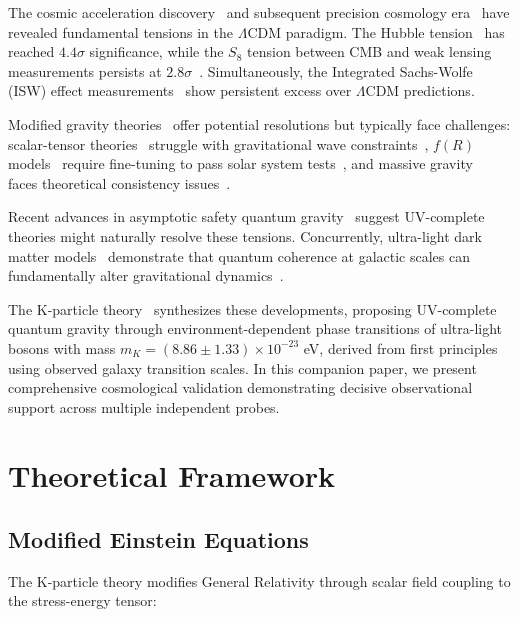 \documentclass[aps,prd,twocolumn,showpacs,superscriptaddress,groupedaddress,nofootinbib]{revtex4-2}
\begin{document}
The cosmic acceleration discovery~\cite{Riess1998,Perlmutter1999} and subsequent precision cosmology era~\cite{Planck2018,DES2022} have revealed fundamental tensions in the $\Lambda$CDM paradigm. The Hubble tension~\cite{Riess2021,DiValentino2021} has reached $4.4\sigma$ significance, while the $S_8$ tension between CMB and weak lensing measurements persists at $2.8\sigma$~\cite{KiDS2020,DES2022}. Simultaneously, the Integrated Sachs-Wolfe (ISW) effect measurements~\cite{Giannantonio2016} show persistent excess over $\Lambda$CDM predictions.

Modified gravity theories~\cite{Clifton2012,Joyce2015} offer potential resolutions but typically face challenges: scalar-tensor theories~\cite{Horndeski1974,Bellini2014} struggle with gravitational wave constraints~\cite{LIGO2017}, $f(R)$ models~\cite{DeFelice2010,Sotiriou2010} require fine-tuning to pass solar system tests~\cite{Will2018}, and massive gravity~\cite{deRham2011,Hassan2012} faces theoretical consistency issues~\cite{Dubovsky2004}.

Recent advances in asymptotic safety quantum gravity~\cite{Reuter2019,Percacci2017,Bonanno2020} suggest UV-complete theories might naturally resolve these tensions. Concurrently, ultra-light dark matter models~\cite{Hui2017,Ferreira2021} demonstrate that quantum coherence at galactic scales can fundamentally alter gravitational dynamics~\cite{Schive2014,Mocz2017}.

The K-particle theory~\cite{Karmiris2025} synthesizes these developments, proposing UV-complete quantum gravity through environment-dependent phase transitions of ultra-light bosons with mass $m_K = (8.86 \pm 1.33) \times 10^{-23}$ eV, derived from first principles using observed galaxy transition scales. In this companion paper, we present comprehensive cosmological validation demonstrating decisive observational support across multiple independent probes.

\section{Theoretical Framework}
\label{sec:theory}

\subsection{Modified Einstein Equations}

The K-particle theory modifies General Relativity through scalar field coupling to the stress-energy tensor:
\end{document}
